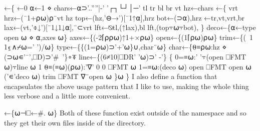 \documentclass{article}%
\begin{document}
\nwenddocs{}\endmoddef\nwstartdeflinemarkup\nwenddeflinemarkup
{}←\{
         ←0
        ⍺←1 ⋄ chars←⍺⊃'..''''|-' '┌┐└┘│─'
        tl tr bl br vt hz←chars
        ←\{
                vrt hrz←(¯1+⍴⍵)⍴¨vt hz
                top←(hz,'⊖→')[¯1↑⍺],hrz
                bot←(⊃⍺),hrz
                ←tr,vt,vrt,br
                lax←(vt,'⌽↓')[¯1↓1↓⍺],¨⊂vrt
                lft←⍉tl,(↑lax),bl
                lft,(top⍪⍵⍪bot),
        \}
        deco←\{⍺←type open ⍵ ⋄ ⍺,axes ⍵\}
        axes←\{(-2⌈⍴⍴⍵)↑1+×⍴⍵\}
        open←\{(1⌈⍴⍵)⍴⍵\}
        trim←\{(~1 1⍷∧⌿⍵=' ')/⍵\}
        type←\{\{(1=⍴⍵)⊃'+'⍵\}∪,char¨⍵\}
        char←\{⍬≡⍴⍵:hz ⋄ (⊃⍵∊'¯',⎕D)⊃'#~'\}∘⍕
        line←\{(6≠10|⎕DR' '⍵)⊃' -'\}
        \{
                0=≡⍵:' '⍪(open ⎕FMT ⍵)⍪line ⍵
                1 ⍬≡(≡⍵)(⍴⍵):'∇' 0 0  ⎕FMT ⍵
                1=≡⍵:(deco ⍵) open ⎕FMT open ⍵
                ('∊'deco ⍵) trim ⎕FMT ∇¨open ⍵
        \}⍵
\}
\eatline
{}\nwendcode{}\nwdocspar
I also define a function {\Tt{}\nwendquote} that encapsulates the above usage
pattern that I like to use, making the whole thing less verbose and
a little more convenient.

\nwenddocs{}\endmoddef\nwstartdeflinemarkup\nwenddeflinemarkup
{}←\{⍵⊣⎕←#. ⍵\}
\eatline
{}\nwendcode{}\nwdocspar
Both of these function exist outside of the {\Tt{}\nwendquote} namespace 
and so they get their own files inside of the {\Tt{}\nwendquote} directory.
\end{document}
